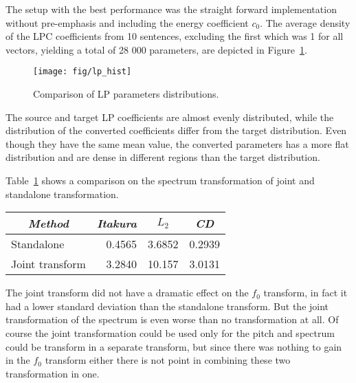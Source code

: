 The setup with the best performance was the straight forward implementation without pre-emphasis and including the energy coefficient $c_0$. The average density of the LPC coefficients from 10 sentences, excluding the first which was 1 for all vectors, yielding a total of 28 000 parameters, are depicted in Figure~\ref{fig:hist_lp}.
\begin{figure}[htbp]
	\begin{center}
		\texttt{[image: fig/lp\_hist]}
		\caption{Comparison of LP parameters distributions.}
		\label{fig:hist_lp}
	\end{center}
\end{figure}
The source and target LP coefficients are almost evenly distributed, while the distribution of the converted coefficients differ from the target distribution. Even though they have the same mean value, the converted parameters has a more flat distribution and are dense in different regions than the target distribution.

Table~\ref{tab:spectrum_joint_transform} shows a comparison on the spectrum transformation of joint and standalone transformation.
\begin{table}[htbp]
	\begin{center}
		\label{tab:spectrum_joint_transform}
		\begin{tabular}{lrrr}
			\toprule
			\multicolumn{1}{c}{\emph{Method}} & \multicolumn{1}{c}{\emph{Itakura}} & \multicolumn{1}{c}{\emph{$L_2$}} & \multicolumn{1}{c}{\emph{CD}}\\
			\midrule
			Standalone & 0.4565 & 3.6852 & 0.2939 \\
			Joint transform & 3.2840 & 10.157 & 3.0131 \\
			\bottomrule			
		\end{tabular}		
	\end{center}	
\end{table}
The joint transform did not have a dramatic effect on the $f_0$ transform, in fact it had a lower standard deviation than the standalone transform. But the joint transformation of the spectrum is even worse than no transformation at all. Of course the joint transformation could be used only for the pitch and spectrum could be transform in a separate transform, but since there was nothing to gain in the $f_0$ transform either there is not point in combining these two transformation in one.

